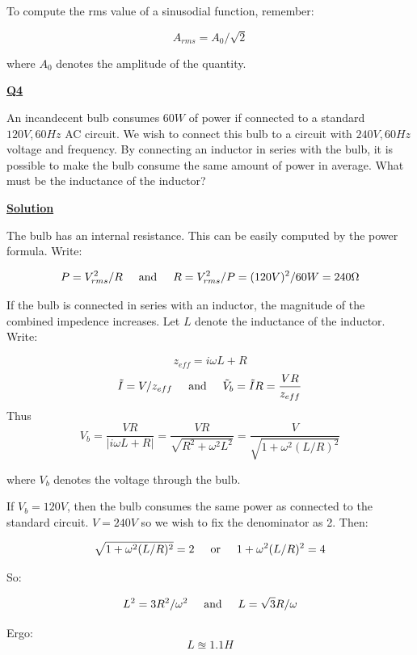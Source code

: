 \documentclass{article}
\newcommand{\new}[1]{
    \vspace{2mm}
    \noindent
    \textbf{
    \underline{#1}}
}
\newcommand{\textOr}{
    {
        \hspace{5mm}
        \textrm{or}
        \hspace{5mm}
    }
}
\newcommand{\textAnd}{
    {
        \hspace{5mm}
        \textrm{and}
        \hspace{5mm}
    }
}
\def\Ohm{{\Omega}}
\begin{document}
To compute the rms value of a sinusodial function, remember:

\[
    A_{rms} = A_0/\sqrt{2}
\]

where $A_0$ denotes the amplitude of the quantity. 

\new{Q4}
An incandecent bulb consumes $60W$ of power if connected to 
a standard $120V, 60Hz$ AC circuit. We wish to connect this 
bulb to a circuit with $240V, 60Hz$ voltage and frequency. 
By connecting an inductor in series with the bulb, it is possible 
to make the bulb consume the same amount of power in average. 
What must be the inductance of the inductor?

\new{Solution}
The bulb has an internal resistance. This can be easily computed 
by the power formula. Write:

\[
    P = V_{rms}^2/R 
    \textAnd 
    R = V_{rms}^2/P = (120V)^2/60W = 240\Ohm
\]

If the bulb is connected in series with an inductor, the 
magnitude of the combined impedence increases. Let 
$L$ denote the inductance of the inductor. Write:

\[
    z_{eff} = i\omega L + R
\]
\[
    \tilde{I} = V/z_{eff} \textAnd \tilde{V}_b = \tilde{I}R = \frac{VR}{z_{eff}}
\]
Thus
\[
    V_b = \frac{VR}
    {|i\omega L + R|}
    = 
    \frac{VR}
    {\sqrt{R^2+\omega^2L^2}}
    = 
    \frac{V}
    {\sqrt{1+\omega^2 (L/R)^2}}
\]

where $V_b$ denotes the voltage through the bulb. 

If $V_b = 120V$, then the bulb consumes the same power as 
connected to the standard circuit. $V = 240V$ so we wish 
to fix the denominator as 2. Then:

\[
\sqrt{1+\omega^2 (L/R)^2} = 2
\textOr 
1+\omega^2(L/R)^2 = 4
\]

So:

\[
    L^2 = 3R^2/\omega^2 
    \textAnd 
    L = \sqrt{3}R/\omega
\]

Ergo:
\[
    \boxed{
        L \approxeq 1.1H
    }
\]  
\end{document}
